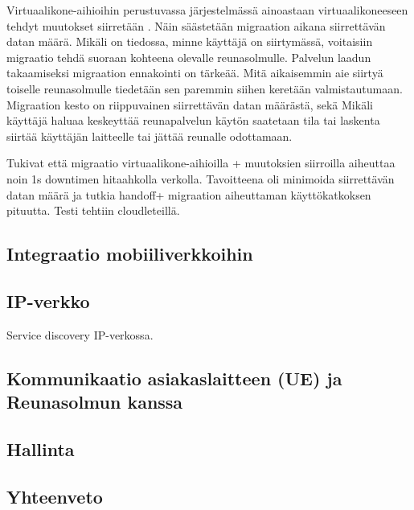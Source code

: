 \documentclass[finnish]{tktltiki2}
\theoremstyle{definition}
\theoremstyle{remark}
\begin{document}
Virtuaalikone-aihioihin perustuvassa järjestelmässä ainoastaan virtuaalikoneeseen tehdyt muutokset siirretään \cite{RefWorks:doc:5a65a533e4b0451a693fbf8e}. Näin säästetään migraation aikana siirrettävän datan määrä.
Mikäli on tiedossa, minne käyttäjä on siirtymässä, voitaisiin migraatio tehdä suoraan kohteena olevalle reunasolmulle.
Palvelun laadun takaamiseksi migraation ennakointi on tärkeää. Mitä aikaisemmin aie siirtyä toiselle reunasolmulle tiedetään sen paremmin siihen keretään valmistautumaan. 
Migraation kesto on riippuvainen siirrettävän datan määrästä, sekä
Mikäli käyttäjä haluaa keskeyttää reunapalvelun käytön saatetaan tila tai laskenta siirtää käyttäjän laitteelle tai jättää reunalle odottamaan.

\cite{ha2015adaptive} Tukivat että migraatio virtuaalikone-aihioilla + muutoksien siirroilla aiheuttaa noin 1s downtimen hitaahkolla verkolla. Tavoitteena oli minimoida siirrettävän datan määrä ja tutkia handoff+ migraation aiheuttaman käyttökatkoksen pituutta. Testi tehtiin cloudleteillä.
\subsection{Integraatio mobiiliverkkoihin}
\subsection{IP-verkko}
Service discovery IP-verkossa.
\subsection{Kommunikaatio asiakaslaitteen (UE) ja Reunasolmun kanssa}
\subsection{Hallinta}


\subsection{Yhteenveto}

 




\lastpage



% 
\end{document}
